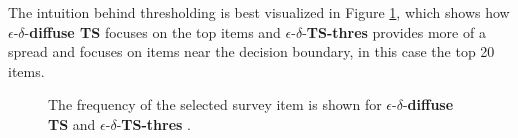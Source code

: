 \documentclass[nonblindrev]{informs3}
\newcommand{\edts}{$\epsilon$-$\delta$-\textbf{diffuse TS} }
\newcommand{\edtsthres}{$\epsilon$-$\delta$-\textbf{TS-thres} }
\begin{document}
The intuition behind thresholding is best visualized in Figure \ref{fig:Frequency}, which shows how \edts focuses on the top items and \edtsthres provides more of a spread and focuses on items near the decision boundary, in this case the top 20 items. 
\begin{figure}%
    \caption{The frequency of the selected survey item is shown for \edts and \edtsthres.}%
    \label{fig:Frequency}%
 	\begin{center}
    \qquad
	\end{center}
\end{figure}

\end{document}
